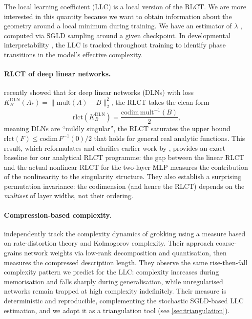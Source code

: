 \documentclass[11pt,a4paper]{article}
\begin{document}
The local learning coefficient (LLC) is a local version of the RLCT. We are more interested in this quantity because we want to obtain information about the geometry around a local minimum during training. We have an estimator of $\lambda$ \citep{lau2023quantifying}, computed via SGLD sampling around a given checkpoint. In developmental interpretability \citep{hoogland2024developmental}, the LLC is tracked throughout training to identify phase transitions in the model's effective complexity.

\paragraph{RLCT of deep linear networks.} \citet{pepinlehalleur2025geometry} recently showed that for deep linear networks (DLNs) with loss $K^{\mathrm{DLN}}_B(A_*) = \|\mathrm{mult}(A) - B\|_2^2$, the RLCT takes the clean form
\begin{equation}
    \mathrm{rlct}(K^{\mathrm{DLN}}_B) = \frac{\mathrm{codim}\,\mathrm{mult}^{-1}(B)}{2},
\end{equation}
meaning DLNs are ``mildly singular'', the RLCT saturates the upper bound $\mathrm{rlct}(F) \leq \mathrm{codim}\,F^{-1}(0)/2$ that holds for general real analytic functions. This result, which reformulates and clarifies earlier work by \citet{aoyagi2024consideration}, provides an exact baseline for our analytical RLCT programme: the gap between the linear RLCT and the actual nonlinear RLCT for the two-layer MLP measures the contribution of the nonlinearity to the singularity structure. They also establish a surprising permutation invariance: the codimension (and hence the RLCT) depends on the \emph{multiset} of layer widths, not their ordering.

\paragraph{Compression-based complexity.} \citet{demoss2025complexity} independently track the complexity dynamics of grokking using a measure based on rate-distortion theory and Kolmogorov complexity. Their approach coarse-grains network weights via low-rank decomposition and quantisation, then measures the compressed description length. They observe the same rise-then-fall complexity pattern we predict for the LLC: complexity increases during memorisation and falls sharply during generalisation, while unregularised networks remain trapped at high complexity indefinitely. Their measure is deterministic and reproducible, complementing the stochastic SGLD-based LLC estimation, and we adopt it as a triangulation tool (see \cref{sec:triangulation}).
\end{document}
